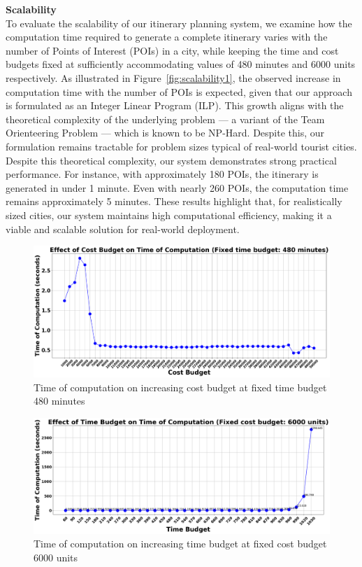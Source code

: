 \noindent\textbf{Scalability}\\
To evaluate the scalability of our itinerary planning system, we examine how the computation time required to generate a complete itinerary varies with the number of Points of Interest (POIs) in a city, while keeping the time and cost budgets fixed at sufficiently accommodating values of 480 minutes and 6000 units respectively. As illustrated in Figure~\ref{fig:scalability1}, the observed increase in computation time with the number of POIs is expected, given that our approach is formulated as an Integer Linear Program (ILP). This growth aligns with the theoretical complexity of the underlying problem — a variant of the Team Orienteering Problem — which is known to be NP-Hard. Despite this, our formulation remains tractable for problem sizes typical of real-world tourist cities. Despite this theoretical complexity, our system demonstrates strong practical performance. For instance, with approximately 180 POIs, the itinerary is generated in under 1 minute. Even with nearly 260 POIs, the computation time remains approximately 5 minutes. These results highlight that, for realistically sized cities, our system maintains high computational efficiency, making it a viable and scalable solution for real-world deployment.

\begin{figure}[htbp]
    \centering
    \includegraphics[width=\textwidth]{plots/costbudgetvstoc.png}
    \caption{Time of computation on increasing cost budget at fixed time budget 480 minutes}
    \label{fig:costbudgetvstoc}
\end{figure}

\begin{figure}[htbp]
    \centering
    \includegraphics[width=\textwidth]{plots/timebudgetvstoc.png}
    \caption{Time of computation on increasing time budget at fixed cost budget 6000 units}
    \label{fig:timebudgetvstoc}
\end{figure}

